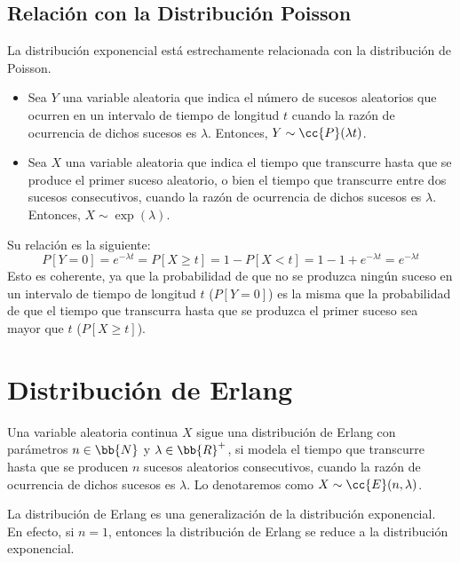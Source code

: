 \subsection{Relación con la Distribución Poisson}

La distribución exponencial está estrechamente relacionada con la distribución de Poisson.
\begin{itemize}
    \item Sea $Y$ una variable aleatoria que indica
    el número de sucesos aleatorios que ocurren en un intervalo de tiempo de longitud $t$
    cuando la razón de ocurrencia de dichos sucesos es $\lambda$. Entonces, $Y\sim \cc{P}(\lambda t)$.

    \item Sea $X$ una variable aleatoria que indica el tiempo que transcurre hasta que se produce el primer suceso aleatorio,
    o bien el tiempo que transcurre entre dos sucesos consecutivos, cuando la razón de ocurrencia de dichos sucesos es $\lambda$.
    Entonces, $X\sim \exp(\lambda)$.
\end{itemize}

Su relación es la siguiente:
\begin{equation*}
    P[Y=0] = e^{-\lambda t} = P[X\geq t] = 1-P[X<t] = 1-1+e^{-\lambda t} = e^{-\lambda t}
\end{equation*}
Esto es coherente, ya que la probabilidad de que no se produzca ningún suceso en un intervalo de tiempo de longitud $t$ ($P[Y=0]$) es la misma que la probabilidad de que
el tiempo que transcurra hasta que se produzca el primer suceso sea mayor que $t$ ($P[X\geq t]$).

\section{Distribución de Erlang}

\begin{definicion}
    Una variable aleatoria continua $X$ sigue una distribución de Erlang con parámetros $n\in \bb{N}$ y $\lambda\in \bb{R}^+$,
    si modela el tiempo que transcurre hasta que se producen $n$ sucesos aleatorios consecutivos, cuando la razón de ocurrencia de dichos sucesos es $\lambda$.
    Lo denotaremos como $X\sim \cc{E}(n,\lambda)$.
\end{definicion}
\begin{observacion}
    La distribución de Erlang es una generalización de la distribución exponencial.
    En efecto, si $n=1$, entonces la distribución de Erlang se reduce a la distribución exponencial.
\end{observacion}

